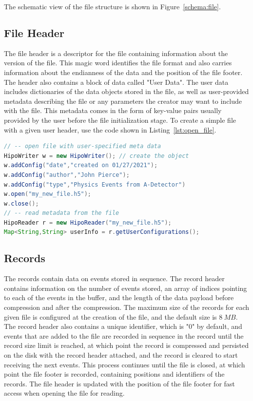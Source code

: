 The schematic view of the file structure is shown in Figure~\ref{schema:file}. 

\subsection{File Header}

The file header is a descriptor for the file containing information about the version of the file. This magic word identifies the file format and also carries information about the endianness of the data and the position of the file footer. The header also contains a block of data called "User Data". The user data includes dictionaries of the data objects stored in the file, as well as user-provided metadata describing the file or any parameters the creator may want to include with the file. This metadata comes in the form of key-value pairs usually provided by the user before the file initialization stage. To create a simple file with a given user header, use the code shown in Listing~\ref{lst:open_file}.
\begin{lstlisting}[language=java, caption=Java example for writing a file with meta-data. The reader object opens the file and retrieves the stored mata data in a form of a key/value map., label=lst:open_file]
// -- open file with user-specified meta data
HipoWriter w = new HipoWriter(); // create the object
w.addConfig("date","created on 01/27/2021");
w.addConfig("author","John Pierce");
w.addConfig("type","Physics Events from A-Detector")
w.open("my_new_file.h5");
w.close();
// -- read metadata from the file
HipoReader r = new HipoReader("my_new_file.h5");
Map<String,String> userInfo = r.getUserConfigurations();
\end{lstlisting}


\subsection{Records}

The records contain data on events stored in sequence. The record header contains information on the number of events stored, an array of indices pointing to each of the events in the buffer, and the length of the data payload before compression and after the compression. The maximum size of the records for each given file is configured at the creation of the file, and the default size is $8~MB$. The record header also contains a unique identifier, which is "0" by default, and events that are added to the file are recorded in sequence in the 
record until the record size limit is reached, at which point the record is compressed and persisted on the disk with the record header attached, and the record is cleared to start receiving the next events. This process continues until the file is closed, at which point the file footer is recorded, containing positions and identifiers of the records. The file header is updated with the position of the file footer for fast access when opening the file for reading.


